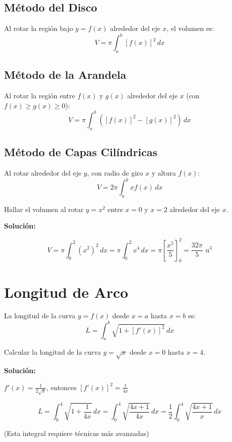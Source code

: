 \documentclass[12pt, a4paper]{book}
\begin{document}
\subsection{Método del Disco}

\begin{definicion}
Al rotar la región bajo $y = f(x)$ alrededor del eje $x$, el volumen es:
\[
V = \pi \int_a^b [f(x)]^2 \, dx
\]
\end{definicion}

\subsection{Método de la Arandela}

\begin{definicion}
Al rotar la región entre $f(x)$ y $g(x)$ alrededor del eje $x$ (con $f(x) \geq g(x) \geq 0$):
\[
V = \pi \int_a^b ([f(x)]^2 - [g(x)]^2) \, dx
\]
\end{definicion}

\subsection{Método de Capas Cilíndricas}

\begin{definicion}
Al rotar alrededor del eje $y$, con radio de giro $x$ y altura $f(x)$:
\[
V = 2\pi \int_a^b x f(x) \, dx
\]
\end{definicion}

\begin{ejemplo}
Hallar el volumen al rotar $y = x^2$ entre $x = 0$ y $x = 2$ alrededor del eje $x$.

\textbf{Solución:}

\[
V = \pi \int_0^2 (x^2)^2 \, dx = \pi \int_0^2 x^4 \, dx = \pi \left[\frac{x^5}{5}\right]_0^2 = \frac{32\pi}{5} \text{ u}^3
\]
\end{ejemplo}

\section{Longitud de Arco}

\begin{definicion}
La longitud de la curva $y = f(x)$ desde $x = a$ hasta $x = b$ es:
\[
L = \int_a^b \sqrt{1 + [f'(x)]^2} \, dx
\]
\end{definicion}

\begin{ejemplo}
Calcular la longitud de la curva $y = \sqrt{x}$ desde $x = 0$ hasta $x = 4$.

\textbf{Solución:}

$f'(x) = \frac{1}{2\sqrt{x}}$, entonces $[f'(x)]^2 = \frac{1}{4x}$

\[
L = \int_0^4 \sqrt{1 + \frac{1}{4x}} \, dx = \int_0^4 \sqrt{\frac{4x+1}{4x}} \, dx = \frac{1}{2}\int_0^4 \sqrt{\frac{4x+1}{x}} \, dx
\]

(Esta integral requiere técnicas más avanzadas)
\end{ejemplo}
\end{document}
